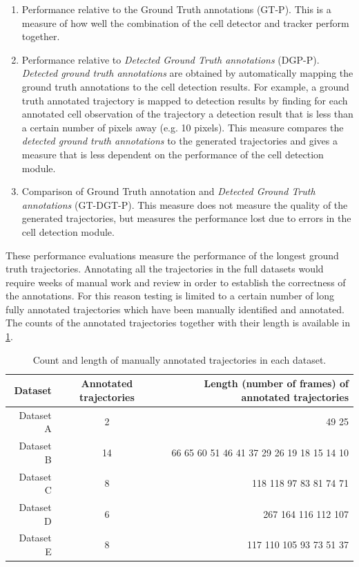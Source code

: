 	\begin{enumerate}
	\item Performance relative to the Ground Truth annotations (GT-P). This is a measure of how well the combination of the cell detector and tracker perform together.
	\item Performance relative to \textit{Detected Ground Truth annotations} (DGP-P). \textit{Detected ground truth annotations} are obtained by automatically mapping the ground truth annotations to the cell detection results. For example, a ground truth annotated trajectory is mapped to detection results by finding for each annotated cell observation of the trajectory a detection result that is less than a certain number of pixels away (e.g. 10 pixels). This measure compares the \textit{detected ground truth annotations} to the generated trajectories and gives a measure that is less dependent on the performance of the cell detection module.
	\item Comparison of Ground Truth annotation and \textit{Detected Ground Truth annotations} (GT-DGT-P). This measure does not measure the quality of the generated trajectories, but measures the performance lost due to errors in the cell detection module. 
	\end{enumerate}
	
	These performance evaluations measure the performance of the longest ground truth trajectories. Annotating all the trajectories in the full datasets would require weeks of manual work and review in order to establish the correctness of the annotations. For this reason testing is limited to a certain number of long fully annotated trajectories which have been manually identified and annotated. The counts of the annotated trajectories together with their length is available in \cref{tab:results_counttrajectories}.
	
	\begin{table}[h]
		\centering
		\begin{tabular}{rcr}
			  Dataset & Annotated trajectories &                              Length (number of frames) of annotated trajectories \\
		\hline
			Dataset A &           2            &                                                                         49    25 \\
			Dataset B &           14           & 66    65    60    51    46    41    37    29    26    19    18    15    14    10 \\
			Dataset C &           8            &                                          118   118    97    83    81    74    71 \\
			Dataset D &           6            &                                                      267   164   116   112   107 \\
			Dataset E &           8            &                                          117   110   105    93    73    51    37
		\end{tabular} 
		\caption{Count and length of manually annotated trajectories in each dataset.}
		\label{tab:results_counttrajectories}
	\end{table}

